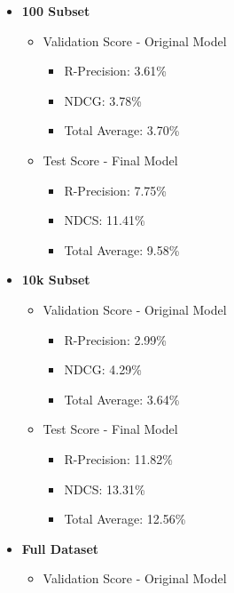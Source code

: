 \documentclass[11pt]{article}
\providecommand{\tightlist}{%
      \setlength{\itemsep}{0pt}\setlength{\parskip}{0pt}}
\begin{document}
\begin{itemize}
\tightlist
\item
  \textbf{100 Subset}

  \begin{itemize}
  \tightlist
  \item
    Validation Score - Original Model

    \begin{itemize}
    \tightlist
    \item
      R-Precision: 3.61\%
    \item
      NDCG: 3.78\%
    \item
      Total Average: 3.70\%
    \end{itemize}
  \item
    Test Score - Final Model

    \begin{itemize}
    \tightlist
    \item
      R-Precision: 7.75\%
    \item
      NDCS: 11.41\%
    \item
      Total Average: 9.58\%
    \end{itemize}
  \end{itemize}
\item
  \textbf{10k Subset}

  \begin{itemize}
  \tightlist
  \item
    Validation Score - Original Model

    \begin{itemize}
    \tightlist
    \item
      R-Precision: 2.99\%
    \item
      NDCG: 4.29\%
    \item
      Total Average: 3.64\%
    \end{itemize}
  \item
    Test Score - Final Model

    \begin{itemize}
    \tightlist
    \item
      R-Precision: 11.82\%
    \item
      NDCS: 13.31\%
    \item
      Total Average: 12.56\%
    \end{itemize}
  \end{itemize}
\item
  \textbf{Full Dataset}

  \begin{itemize}
  \tightlist
  \item
    Validation Score - Original Model


\end{itemize}
\end{itemize}
\end{document}
